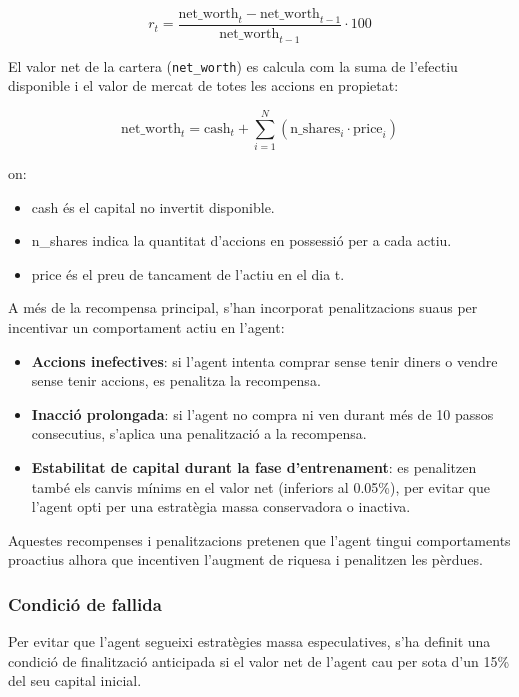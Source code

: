 \documentclass[12pt,a4paper,twoside]{book}
\begin{document}
\begin{equation}
r_t = \frac{\text{net\_worth}_t - \text{net\_worth}_{t-1}}{\text{net\_worth}_{t-1}} \cdot 100
\end{equation}

El valor net de la cartera (\texttt{net\_worth}) es calcula com la suma de l'efectiu disponible i el valor de mercat de totes les accions en propietat:

\begin{equation}
\text{net\_worth}_t = \text{cash}_t + \sum_{i=1}^{N} \left( \text{n\_shares}_i \cdot \text{price}_i \right)
\end{equation}

on:
\begin{itemize}
    \item cash és el capital no invertit disponible.
    \item n\_shares indica la quantitat d'accions en possessió per a cada actiu.
    \item price és el preu de tancament de l'actiu en el dia t.
\end{itemize}

A més de la recompensa principal, s'han incorporat penalitzacions suaus per incentivar un comportament actiu en l'agent:

\begin{itemize}
    \item \textbf{Accions inefectives}: si l'agent intenta comprar sense tenir diners o vendre sense tenir accions, es penalitza la recompensa.
    \item \textbf{Inacció prolongada}: si l'agent no compra ni ven durant més de 10 passos consecutius, s'aplica una penalització a la recompensa.
    \item \textbf{Estabilitat de capital durant la fase d'entrenament}: es penalitzen també els canvis mínims en el valor net (inferiors al 0.05\%), per evitar que l'agent opti per una estratègia massa conservadora o inactiva.
\end{itemize}

Aquestes recompenses i penalitzacions pretenen que l'agent tingui comportaments proactius alhora que incentiven l'augment de riquesa i penalitzen les pèrdues.

\subsubsection*{Condició de fallida}

Per evitar que l'agent segueixi estratègies massa especulatives, s'ha definit una condició de finalització anticipada si el valor net de l'agent cau per sota d'un 15\% del seu capital inicial.
\end{document}
